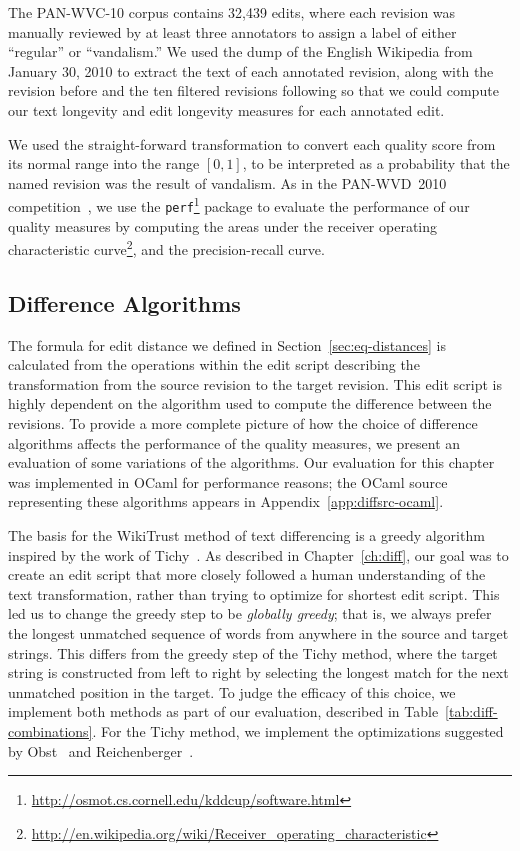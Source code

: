 The PAN-WVC-10 corpus contains 32,439 edits, where each revision was
manually reviewed by at least three annotators to assign a label
of either ``regular'' or ``vandalism.''
We used the dump of the English Wikipedia from January 30, 2010
to extract the text of each annotated revision, along with the revision
before and the ten filtered revisions following so that we could compute
our text longevity and edit longevity measures for each annotated edit.

We used the straight-forward transformation to convert
each quality score from its normal range into the range
$[0,1]$, to be interpreted as a probability that the named
revision was the result of vandalism.
As in the PAN-WVD~2010 competition~\cite{Potthast2010b}, we use the
\texttt{perf}\footnote{\url{http://osmot.cs.cornell.edu/kddcup/software.html}}
package to evaluate the performance of our quality measures
by computing the areas under the receiver operating characteristic
curve\footnote{\url{http://en.wikipedia.org/wiki/Receiver_operating_characteristic}},
and the precision-recall curve.

\subsection{Difference Algorithms}

The formula for edit distance we defined in
Section~\ref{sec:eq-distances} is calculated
from the operations within the edit script describing the transformation
from the source revision to the target revision.
This edit script is highly dependent on the algorithm used to
compute the difference between the revisions.
To provide a more complete picture of how the choice of difference
algorithms affects the performance of the quality measures,
we present an evaluation of some variations of the algorithms.
Our evaluation for this chapter was implemented in OCaml for performance
reasons;
the OCaml source representing these algorithms appears
in Appendix~\ref{app:diffsrc-ocaml}.

The basis for the WikiTrust method of text differencing is a greedy
algorithm inspired by the work of Tichy~\cite{Tichy1984}.
As described in Chapter~\ref{ch:diff}, our goal was to create an edit
script that more closely followed a human understanding of the text
transformation, rather than trying to optimize for shortest edit script.
This led us to change the greedy step to be \textit{globally greedy};
that is, we always prefer the longest unmatched sequence of words
from anywhere in the source and target strings.
This differs from the greedy step of the Tichy method, where the
target string is constructed from left to right by selecting the longest
match for the next unmatched position in the target.
To judge the efficacy of this choice, we implement both methods as part
of our evaluation, described in Table~\ref{tab:diff-combinations}.
For the Tichy method, we implement the optimizations suggested by
Obst~\cite{Obst1987} and Reichenberger~\cite{Reichenberger1991}.

